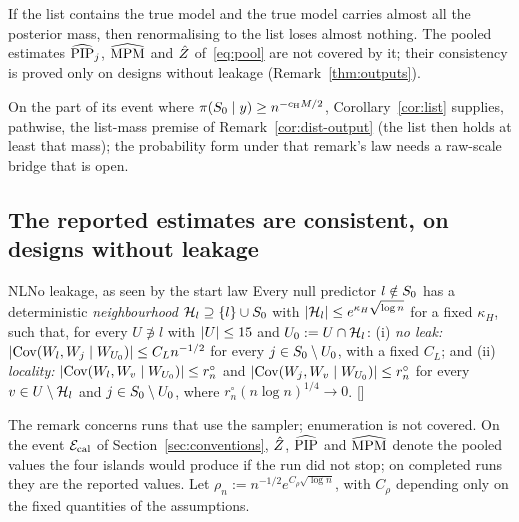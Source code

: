 
If the list contains the true model and the true model carries almost all the posterior mass, then renormalising
to the list loses almost nothing. The pooled estimates $\widehat{\mathrm{PIP}}_j$, $\widehat{\mathrm{MPM}}$ and $\hat Z$ of~\eqref{eq:pool} are not
covered by it; their consistency is proved only on designs without leakage (Remark~\ref{thm:outputs}).

On the part of its event where $\pi(S_0\mid y)\ge n^{-c_{\mathrm H}M/2}$, Corollary~\ref{cor:list} supplies, pathwise, the
list-mass premise of Remark~\ref{cor:dist-output} (the list then holds at least that mass); the probability form under that
remark's law needs a raw-scale bridge that is open.

\subsection{The reported estimates are consistent, on designs without leakage}\label{sec:outputs}



\begin{assumption}{NL}{No leakage, as seen by the start law}
Every null predictor $l\notin S_0$ has a deterministic \emph{neighbourhood} $\mathcal H_l\supseteq\{l\}\cup S_0$ with
$\lvert \mathcal H_l\rvert\le e^{\kappa_H\sqrt{\log n}}$ for a fixed $\kappa_H$, such that, for every $U\not\ni l$ with $\lvert U\rvert\le15$ and
$U_0:=U\cap\mathcal H_l$: (i) \emph{no leak:} $\lvert \operatorname{Cov}(W_l,W_j\mid W_{U_0})\rvert\le C_Ln^{-1/2}$ for every $j\in S_0\setminus U_0$,
with a fixed $C_L$; and (ii) \emph{locality:} $\lvert \operatorname{Cov}(W_l,W_v\mid W_{U_0})\rvert\le r^\circ_n$ and
$\lvert \operatorname{Cov}(W_j,W_v\mid W_{U_0})\rvert\le r^\circ_n$ for every $v\in U\setminus\mathcal H_l$ and $j\in S_0\setminus U_0$, where
$r^\circ_n(n\log n)^{1/4}\to0$. \hfill []
\end{assumption}

The remark concerns runs that use the sampler; enumeration is not covered. On the event $\mathcal E_{\mathrm{cal}}$ of
Section~\ref{sec:conventions}, $\hat Z$, $\widehat{\mathrm{PIP}}$ and
$\widehat{\mathrm{MPM}}$ denote the pooled values the four islands would produce if the run did not stop; on completed runs they
are the reported values. Let $\rho_n:=n^{-1/2}e^{C_\rho\sqrt{\log n}}$, with $C_\rho$ depending only on the fixed quantities of the
assumptions.

